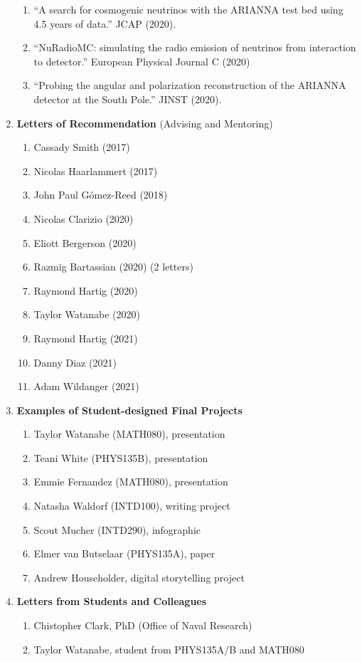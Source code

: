 \documentclass[../../main.tex]{subfiles}
\begin{document}
\begin{enumerate}
\begin{enumerate}
\item ``A search for cosmogenic neutrinos with the ARIANNA test bed using 4.5 years of data.'' JCAP (2020).
\item ``NuRadioMC: simulating the radio emission of neutrinos from interaction to detector.'' European Physical Journal C (2020)
\item ``Probing the angular and polarization reconstruction of the ARIANNA detector at the South Pole.'' JINST (2020).
\end{enumerate}
\item \textbf{Letters of Recommendation} (Advising and Mentoring)
\begin{enumerate}
\item Cassady Smith (2017)
\item Nicolas Haarlammert (2017)
\item John Paul G\'{o}mez-Reed (2018)
\item Nicolas Clarizio (2020)
\item Eliott Bergerson (2020)
\item Razmig Bartassian (2020) (2 letters)
\item Raymond Hartig (2020)
\item Taylor Watanabe (2020)
\item Raymond Hartig (2021)
\item Danny Diaz (2021)
\item Adam Wildanger (2021)
\end{enumerate}
\item \textbf{Examples of Student-designed Final Projects}
\begin{enumerate}
\item Taylor Watanabe (MATH080), presentation
\item Teani White (PHYS135B), presentation
\item Emmie Fernandez (MATH080), presentation
\item Natasha Waldorf (INTD100), writing project
\item Scout Mucher (INTD290), infographic
\item Elmer van Butselaar (PHYS135A), paper
\item Andrew Householder, digital storytelling project
\end{enumerate}
\item \textbf{Letters from Students and Colleagues}
\begin{enumerate}
\item Chistopher Clark, PhD (Office of Naval Research)
\item Taylor Watanabe, student from PHYS135A/B and MATH080

\end{enumerate}
\end{enumerate}
\end{document}
